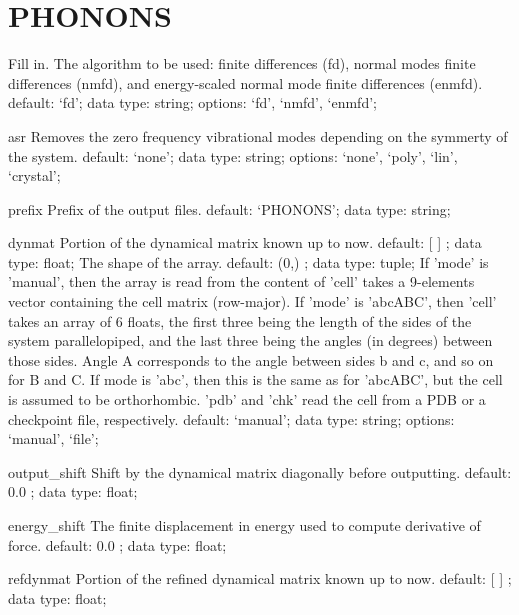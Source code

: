 \section{PHONONS}
\label{PHONONS}
\begin{ipifield}{}%
{Fill in.}%
{}%
{%
{The algorithm to be used: finite differences (fd), normal modes finite differences (nmfd), and energy-scaled normal mode finite differences (enmfd).}%
{default: `fd'; data type: string; options: `fd', `nmfd', `enmfd'; }%
}
\begin{ipifield}{asr}%
{Removes the zero frequency vibrational modes depending on the symmerty of the system.}%
{default: `none'; data type: string; options: `none', `poly', `lin', `crystal'; }%
{}
\end{ipifield}
\begin{ipifield}{prefix}%
{Prefix of the output files.}%
{default: `PHONONS'; data type: string; }%
{}
\end{ipifield}
\begin{ipifield}{dynmat}%
{Portion of the dynamical matrix known up to now.}%
{default:  [ ] ; data type: float; }%
{%
{The shape of the array.}%
{default:  (0,) ; data type: tuple; }%
%
{If 'mode' is 'manual', then the array is read from the content of 'cell' takes a 9-elements vector containing the cell matrix (row-major). If 'mode' is 'abcABC', then 'cell' takes an array of 6 floats, the first three being the length of the sides of the system parallelopiped, and the last three being the angles (in degrees) between those sides. Angle A corresponds to the angle between sides b and c, and so on for B and C. If mode is 'abc', then this is the same as for 'abcABC', but the cell is assumed to be orthorhombic. 'pdb' and 'chk' read the cell from a PDB or a checkpoint file, respectively.}%
{default: `manual'; data type: string; options: `manual', `file'; }%
}
\end{ipifield}
\begin{ipifield}{output\_shift}%
{Shift by the dynamical matrix diagonally before outputting.}%
{default:  0.0 ; data type: float; }%
{}
\end{ipifield}
\begin{ipifield}{energy\_shift}%
{The finite displacement in energy used to compute derivative of force.}%
{default:  0.0 ; data type: float; }%
{}
\end{ipifield}
\begin{ipifield}{refdynmat}%
{Portion of the refined dynamical matrix known up to now.}%
{default:  [ ] ; data type: float; }%

\end{ipifield}
\end{ipifield}
